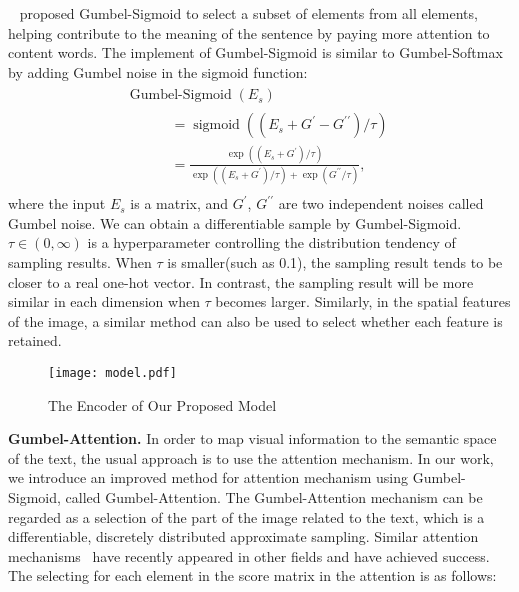 \documentclass[11pt]{article}
\begin{document}
 ~\citet{DBLP:conf/acl/GengWWQLT20} proposed Gumbel-Sigmoid to select a subset of elements from all elements, helping contribute to the meaning of the sentence by paying more attention to content words. The implement of Gumbel-Sigmoid is similar to Gumbel-Softmax~\cite{DBLP:conf/iclr/JangGP17} by adding Gumbel noise in the sigmoid function:
\begin{equation}
\begin{aligned}
\begin{array}{l}\operatorname { Gumbel-Sigmoid }\left({E}_{s}\right) \\ \qquad \begin{aligned}&= \operatorname{sigmoid}\left(\left({E}_{s}+{G}^{\prime}-{G}^{\prime \prime}\right) / \tau\right) \\ 
&=\frac{\exp \left(\left({E}_{s}+{G}^{\prime}\right) / \tau\right)}{\exp \left(\left({E}_{s}+{G}^{\prime}\right) / \tau\right)+\exp \left({G}^{\prime \prime} / \tau\right)}, \end{aligned}\end{array}
\end{aligned}
\end{equation}
where the input $E_s$ is a matrix, and ${G}^{\prime}$, ${G}^{\prime \prime}$ are two independent noises called Gumbel noise. We can obtain a differentiable sample by Gumbel-Sigmoid. 
$\tau \in (0, \infty)$ is a hyperparameter controlling the distribution tendency of sampling results. When $\tau$ is smaller(such as 0.1), the sampling result tends to be closer to a real one-hot vector. In contrast, the sampling result will be more similar in each dimension when $\tau$ becomes larger.
Similarly, in the spatial features of the image, a similar method can also be used to select whether each feature is retained.

\begin{figure}[t]
\centering\texttt{[image: model.pdf]}
	\footnotesize\caption{The Encoder of Our Proposed Model} 
	\label{fig:02}
\end{figure}

\textbf{Gumbel-Attention.} In order to map visual information to the semantic space of the text, the usual approach is to use the attention mechanism. In our work, we introduce an improved method for attention mechanism using Gumbel-Sigmoid, called Gumbel-Attention. 
The Gumbel-Attention mechanism can be regarded as a selection of the part of the image related to the text, which is a differentiable, discretely distributed approximate sampling. 
Similar attention mechanisms~\citep{DBLP:conf/mm/ZhengLLZ020}  have recently appeared in other fields and have achieved success.
The selecting for each element in the score matrix in the attention is as follows:
\end{document}
